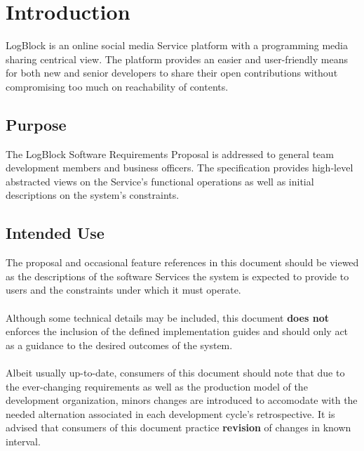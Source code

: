 \chapter{Introduction}

LogBlock is an online social media Service platform with a programming media sharing centrical view. The platform provides an easier and user-friendly means 
for both new and senior developers to share their open contributions without compromising too much on reachability of contents.

    \section{Purpose}
    The LogBlock Software Requirements Proposal is addressed to general team development members and business officers. 
    The specification provides high-level abstracted views on the Service's functional operations as well as initial descriptions on the system's constraints.

    \section{Intended Use}
    The proposal and occasional feature references in this document should be viewed as
    the descriptions of the software Services the system is expected to provide to  users and the constraints
    under which it must operate.
    \\\\
    Although some technical details may be included, this document \textbf{does not} enforces the inclusion of the defined implementation guides and should only act as a guidance
    to the desired outcomes of the system.
    \\\\
    Albeit usually up-to-date, consumers of this document should note that due to the ever-changing requirements as well as the production model of the development organization, 
    minors changes are introduced to accomodate with the needed alternation associated in each development cycle's retrospective. It is advised that consumers of this document practice
    \textbf{revision} of changes in known interval.

